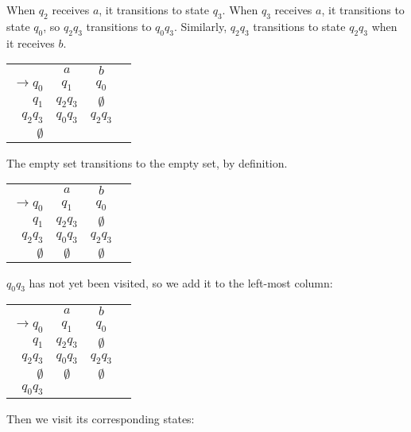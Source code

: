 When \(q_2\) receives \(a\), it transitions to state \(q_3\). When \(q_3\) receives \(a\), it transitions to state \(q_0\), so \(q_2q_3\) transitions to \(q_0q_3\). Similarly, \(q_2q_3\) transitions to state \(q_2q_3\) when it receives \(b\).

\begin{center}\begin{tabular}{r c c r}
         & \(a\) & \(b\) & \\\cmidrule{2-3}
    \(\to q_0\) & \(q_1\) & \(q_0\) &  \\
          \(q_1\) & \(q_2q_3\) & \(\emptyset \) & \\
          \(q_2q_3\) & \(q_0q_3\) & \(q_2q_3\) & \\
          \(\emptyset \) & & &
\end{tabular}\end{center}

The empty set transitions to the empty set, by definition. 

\begin{center}\begin{tabular}{r c c r}
         & \(a\) & \(b\) & \\\cmidrule{2-3}
    \(\to q_0\) & \(q_1\) & \(q_0\) &  \\
          \(q_1\) & \(q_2q_3\) & \(\emptyset \) & \\
          \(q_2q_3\) & \(q_0q_3\) & \(q_2q_3\) & \\
          \(\emptyset \) & \(\emptyset \) & \(\emptyset \) &
\end{tabular}\end{center}

\(q_0q_3\) has not yet been visited, so we add it to the left-most column:

\begin{center}\begin{tabular}{r c c r}
         & \(a\) & \(b\) & \\\cmidrule{2-3}
    \(\to q_0\) & \(q_1\) & \(q_0\) &  \\
          \(q_1\) & \(q_2q_3\) & \(\emptyset \) & \\
          \(q_2q_3\) & \(q_0q_3\) & \(q_2q_3\) & \\
          \(\emptyset \) & \(\emptyset \) & \(\emptyset \) &\\
          \(q_0q_3\) & & & 
\end{tabular}\end{center}

Then we visit its corresponding states:


